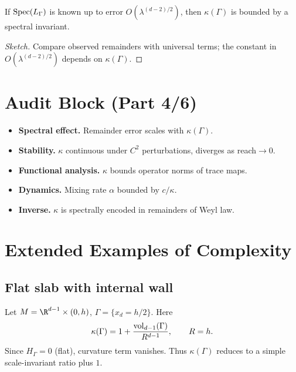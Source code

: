 \begin{theorem}
If $\operatorname{Spec}(L_\Gamma)$ is known up to error $O(\lambda^{(d-2)/2})$, then $\kappa(\Gamma)$ is bounded by a spectral invariant.
\end{theorem}

\begin{proof}[Sketch]
Compare observed remainders with universal terms; the constant in $O(\lambda^{(d-2)/2})$ depends on $\kappa(\Gamma)$.
\end{proof}

\section{Audit Block (Part 4/6)}
\label{sec:audit-part4}

\begin{itemize}
\item \textbf{Spectral effect.} Remainder error scales with $\kappa(\Gamma)$.
\item \textbf{Stability.} $\kappa$ continuous under $C^2$ perturbations, diverges as reach$\to 0$.
\item \textbf{Functional analysis.} $\kappa$ bounds operator norms of trace maps.
\item \textbf{Dynamics.} Mixing rate $\alpha$ bounded by $c/\kappa$.
\item \textbf{Inverse.} $\kappa$ is spectrally encoded in remainders of Weyl law.
\end{itemize}

\bigskip


\section{Extended Examples of Complexity}
\label{sec:examples-complexity}

\subsection{Flat slab with internal wall}
Let $M=\R^{d-1}\times(0,h)$, $\Gamma=\{x_d=h/2\}$.  
Here
\[
\kappa(\Gamma)=1+\frac{\operatorname{vol}_{d-1}(\Gamma)}{R^{d-1}}, \qquad R=h.
\]
Since $H_\Gamma=0$ (flat), curvature term vanishes.  
Thus $\kappa(\Gamma)$ reduces to a simple scale-invariant ratio plus $1$.

